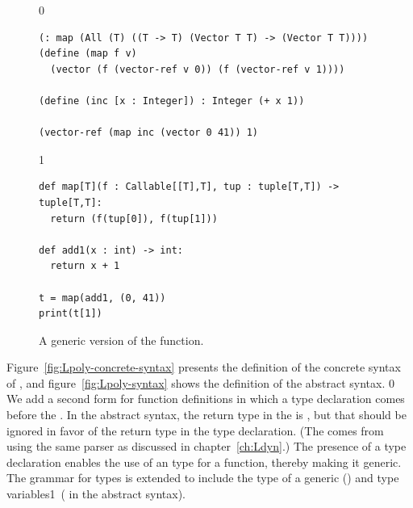 \documentclass[7x10]{TimesAPriori_MIT}%
\def\racketEd{0}
\def\pythonEd{1}
\def\edition{1}
\newcommand{\pythonColor}[0]{}
\newcommand{\python}[1]{{\if\edition\pythonEd\pythonColor #1\fi}}
\numberwithin{theorem}{chapter}
\numberwithin{definition}{chapter}
\numberwithin{equation}{chapter}
\begin{document}
\begin{figure}[tbp]
\begin{tcolorbox}[colback=white]  
{\if\edition\racketEd
\begin{lstlisting}
(: map (All (T) ((T -> T) (Vector T T) -> (Vector T T))))
(define (map f v)
  (vector (f (vector-ref v 0)) (f (vector-ref v 1))))

(define (inc [x : Integer]) : Integer (+ x 1))

(vector-ref (map inc (vector 0 41)) 1)
\end{lstlisting}
\fi}
{\if\edition\pythonEd\pythonColor
\begin{lstlisting}
def map[T](f : Callable[[T],T], tup : tuple[T,T]) -> tuple[T,T]:
  return (f(tup[0]), f(tup[1]))

def add1(x : int) -> int:
  return x + 1

t = map(add1, (0, 41))
print(t[1])
\end{lstlisting}
\fi}
\end{tcolorbox}

\caption{A generic version of the  function.}
\label{fig:map-poly}
\end{figure}

Figure~\ref{fig:Lpoly-concrete-syntax} presents the definition of the
concrete syntax of \LangPoly{}, and figure~\ref{fig:Lpoly-syntax}
shows the definition of the abstract syntax.
%
{\if\edition\racketEd
We add a second form for function definitions in which a type
declaration comes before the . In the abstract syntax,
the return type in the  is \CANYTY{}, but that should be
ignored in favor of the return type in the type declaration.  (The
\CANYTY{} comes from using the same parser as discussed in
chapter~\ref{ch:Ldyn}.)  The presence of a type declaration
enables the use of an  type for a function, thereby making
it generic.
\fi}
%
The grammar for types is extended to include the type of a generic
() and type variables\python{\ ( in the
  abstract syntax)}.

\newcommand{\LpolyGrammarRacket}{
\begin{array}{lcl}
  \Type &::=& \LP\key{All}~\LP\Var\ldots\RP~ \Type\RP \MID \Var \\
  \Def &::=& \LP\key{:}~\Var~\Type\RP \\
    &&       \LP\key{define}~ \LP\Var ~ \Var\ldots\RP ~ \Exp\RP 
\end{array}
}

\newcommand{\LpolyASTRacket}{
\begin{array}{lcl}
  \Type &::=& \LP\key{All}~\LP\Var\ldots\RP~ \Type\RP \MID \Var \\
  \Def &::=& \DECL{\Var}{\Type} \\
   &&  \DEF{\Var}{\LP\Var \ldots\RP}{\key{'Any}}{\code{'()}}{\Exp}  
\end{array}
}  
\end{document}
